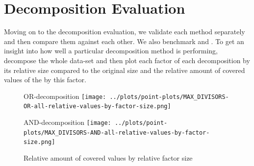 \section{Decomposition Evaluation}
\label{ch:Evaluation:decomposition-quality}
Moving on to the decomposition evaluation, we validate each method separately and then compare them against each other.
We also benchmark \andDecomp and \orDecomp.
To get an insight into how well a particular decomposition method is performing, decompose the whole data-set and then plot each factor of each decomposition by its relative size compared to the original \DFA size and the relative amount of covered values of the \DFA by this factor.
\begin{figure}[t]
	\begin{minipage}[h]{0.49\linewidth}
		\centering
		OR-decomposition
		\texttt{[image: ../plots/point-plots/MAX\_DIVISORS-OR-all-relative-values-by-factor-size.png]}
	\end{minipage}
	\begin{minipage}[h]{0.49\linewidth}
		\centering
		AND-decomposition
		\texttt{[image: ../plots/point-plots/MAX\_DIVISORS-AND-all-relative-values-by-factor-size.png]}
	\end{minipage}
	\caption{Relative amount of covered values by relative factor size}
	\label{fig:eval:max-divisor-all-factors}
\end{figure}


